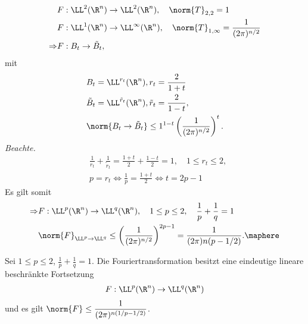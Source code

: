 \begin{bemn}[Anwendung.]
\begin{align*}
&F : \LL^2(\R^n)\to \LL^2(\R^n),\quad \norm{T}_{2,2} = 1\\
&F : \LL^1(\R^n)\to \LL^\infty(\R^n),\quad \norm{T}_{1,\infty} =
\frac{1}{(2\pi)^{n/2}}\\
\Rightarrow & F: B_t\to \tilde{B}_t,
\end{align*}
mit
\begin{align*}
&B_t = \LL^{r_t}(\R^n), r_t = \frac{2}{1+t}\\
&\tilde{B}_t = \LL^{\tilde{r}_t}(\R^n), \tilde{r}_t = \frac{2}{1-t},\\
&\norm{B_t\to \tilde{B}_t} \le 1^{1-t}\left(\frac{1}{(2\pi)^{n/2}}\right)^t.
\end{align*}
\textit{Beachte.}
\begin{align*}
&\frac{1}{r_t} + \frac{1}{\tilde{r}_t} = \frac{1+t}{2} + \frac{1-t}{2} = 1,\quad
1\le r_t\le 2,\\
&p = r_t \Leftrightarrow \frac{1}{p} = \frac{1+t}{2} \Leftrightarrow t = 2p-1
\end{align*}
Es gilt somit
\begin{align*}
\Rightarrow &F: \LL^p(\R^n) \to \LL^q(\R^n),\quad 1\le p\le
2,\quad \frac{1}{p}+\frac{1}{q} = 1\\
&\norm{F}_{\LL^p\to\LL^{q}} \le \left(\frac{1}{(2\pi)^{n/2}}\right)^{2p-1} =
\frac{1}{(2\pi){n(p-1/2)}}.\maphere
\end{align*}
\end{bemn}

\begin{prop}
\label{prop:2.42}
Sei $1\le p\le 2$, $\frac{1}{p}+\frac{1}{q}=1$. Die Fouriertransformation
besitzt eine eindeutige lineare beschränkte Fortsetzung
\begin{align*}
F: \LL^p(\R^n)\to \LL^q(\R^n)
\end{align*}
und es gilt $\norm{F}\le\dfrac{1}{(2\pi)^{n(1/p-1/2)}}$.\fishhere
\end{prop}